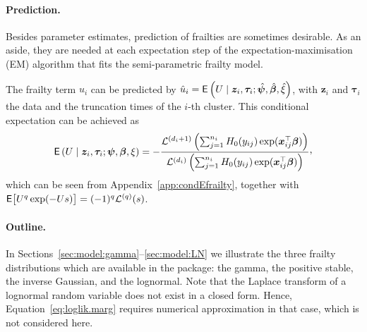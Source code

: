 \paragraph{Prediction.}
Besides parameter estimates, prediction of frailties are sometimes desirable.
  As an aside, they are needed at each expectation step of the expectation-maximisation (EM) algorithm that fits
  the semi-parametric frailty model.

The frailty term $u_i$ can be predicted by
  $\hat u_i = \mathsf{E}\left( U \mid \bm z_i, \bm \tau_i ; \hat{\bm\psi}, \hat{\bm\beta}, \hat\xi \right)$,
  with $\bm z_i$ and $\bm \tau_i$ the data and the truncation times of the $i$-th cluster.
This conditional expectation can be achieved as
  \begin{equation*}
    \E\left( U \mid \bm z_i, \bm \tau_i ; \bm\psi, \bm\beta, \xi \right) =
    - \frac{
      \mathcal L^{(d_i + 1)} \left(
          \sum_{j=1}^{n_i}  H_0(y_{ij})
            \exp(\bm x_{ij}^\top \bm\beta)
        \right)
    }{
      \mathcal L^{(d_i)} \left(
          \sum_{j=1}^{n_i} H_0(y_{ij})
            \exp(\bm x_{ij}^\top \bm\beta)
        \right)
    }\ccom
  \end{equation*}
  which can be seen from Appendix~\ref{app:condEfrailty}, together with
  $\mathsf{E}\big[ U^q \exp(-Us) \big] = (-1)^q \mathcal L^{(q)}(s)$.


\paragraph{Outline.}
In Sections~\ref{sec:model:gamma}--\ref{sec:model:LN} we illustrate the three frailty distributions
  which are available in the  package:
  the gamma, the positive stable, the inverse Gaussian, and the lognormal.
Note that the Laplace transform of a lognormal random variable does not exist in a closed form.
Hence, Equation~\ref{eq:loglik.marg} requires numerical approximation in that case, which is not considered here.
